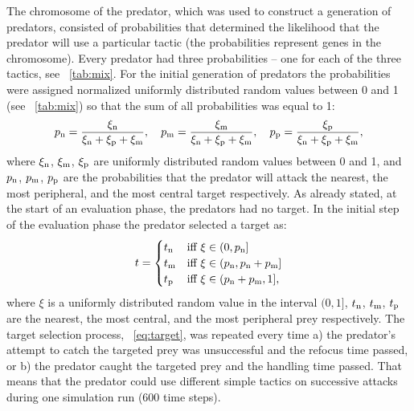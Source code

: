 The chromosome of the predator, which was used to construct a generation of predators, consisted of probabilities that determined the likelihood that the predator will use a particular tactic (\ie the probabilities represent genes in the chromosome). Every predator had three probabilities -- one for each of the three tactics, see \tablename~\ref{tab:mix}. For the initial generation of predators the probabilities were assigned normalized uniformly distributed random values between 0 and 1 (see \tablename~\ref{tab:mix}) so that the sum of all probabilities was equal to 1:
%
\begin{equation}
p_\textnormal{n}=\frac{\xi_\textnormal{n}}{\xi_\textnormal{n}+\xi_\textnormal{p}+\xi_\textnormal{m}},\quad p_\textnormal{m}=\frac{\xi_\textnormal{m}}{\xi_\textnormal{n}+\xi_\textnormal{p}+\xi_\textnormal{m}},\quad p_\textnormal{p}=\frac{\xi_\textnormal{p}}{\xi_\textnormal{n}+\xi_\textnormal{p}+\xi_\textnormal{m}},
\end{equation}
%
where $\xi_\textnormal{n}$, $\xi_\textnormal{m}$, $\xi_\textnormal{p}$ are uniformly distributed random values between 0 and 1, and $p_\textnormal{n}$, $p_\textnormal{m}$, $p_\textnormal{p}$ are the probabilities that the predator will attack the nearest, the most peripheral, and the most central target respectively. As already stated, at the start of an evaluation phase, the predators had no target. In the initial step of the evaluation phase the predator selected a target as:
%
\begin{equation}
t=\begin{cases}
t_\textnormal{n} & \textnormal{iff}\  \xi \in (0,p_\textnormal{n}]\\
t_\textnormal{m} & \textnormal{iff}\  \xi \in (p_\textnormal{n},p_\textnormal{n}+p_\textnormal{m}]\\
t_\textnormal{p} & \textnormal{iff}\  \xi \in (p_\textnormal{n}+p_\textnormal{m},1],
\end{cases}
\label{eq:target}
\end{equation}
%
where $\xi$ is a uniformly distributed random value in the interval $(0, 1]$, $t_\textnormal{n}$, $t_\textnormal{m}$, $t_\textnormal{p}$ are the nearest, the most central, and the most peripheral prey respectively. The target selection process, \eq~\eqref{eq:target}, was repeated every time a) the predator's attempt to catch the targeted prey was unsuccessful and the refocus time passed, or b) the predator caught the targeted prey and the handling time passed. That means that the predator could use different simple tactics on successive attacks during one simulation run (600 time steps).

